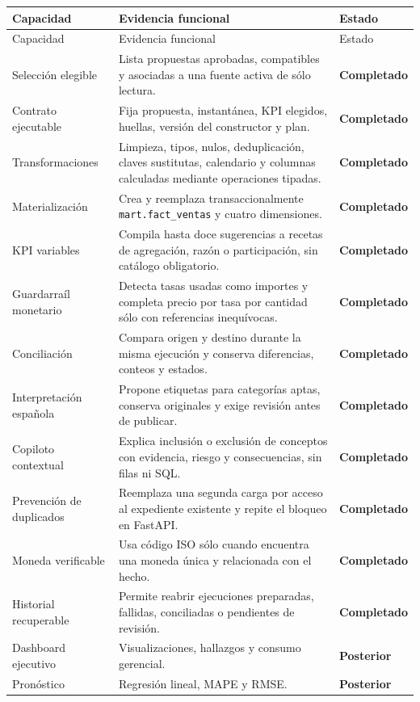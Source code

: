 \documentclass[11pt,letterpaper]{article}
\newcommand{\file}[1]{\texttt{#1}}
\newcommand{\ok}{\textcolor{success}{\textbf{Completado}}}
\newcommand{\pending}{\textcolor{warning}{\textbf{Posterior}}}
\begin{document}
\begin{longtable}{@{}p{}p{}p{}@{}}
  \toprule
  Capacidad & Evidencia funcional & Estado \\
  \midrule
  \endfirsthead
  \toprule
  Capacidad & Evidencia funcional & Estado \\
  \midrule
  \endhead
  Selección elegible & Lista propuestas aprobadas, compatibles y asociadas a una fuente activa de sólo lectura. & \ok \\
  Contrato ejecutable & Fija propuesta, instantánea, KPI elegidos, huellas, versión del constructor y plan. & \ok \\
  Transformaciones & Limpieza, tipos, nulos, deduplicación, claves sustitutas, calendario y columnas calculadas mediante operaciones tipadas. & \ok \\
  Materialización & Crea y reemplaza transaccionalmente \file{mart.fact\_ventas} y cuatro dimensiones. & \ok \\
  KPI variables & Compila hasta doce sugerencias a recetas de agregación, razón o participación, sin catálogo obligatorio. & \ok \\
  Guardarraíl monetario & Detecta tasas usadas como importes y completa precio por tasa por cantidad sólo con referencias inequívocas. & \ok \\
  Conciliación & Compara origen y destino durante la misma ejecución y conserva diferencias, conteos y estados. & \ok \\
  Interpretación española & Propone etiquetas para categorías aptas, conserva originales y exige revisión antes de publicar. & \ok \\
  Copiloto contextual & Explica inclusión o exclusión de conceptos con evidencia, riesgo y consecuencias, sin filas ni SQL. & \ok \\
  Prevención de duplicados & Reemplaza una segunda carga por acceso al expediente existente y repite el bloqueo en FastAPI. & \ok \\
  Moneda verificable & Usa código ISO sólo cuando encuentra una moneda única y relacionada con el hecho. & \ok \\
  Historial recuperable & Permite reabrir ejecuciones preparadas, fallidas, conciliadas o pendientes de revisión. & \ok \\
  Dashboard ejecutivo & Visualizaciones, hallazgos y consumo gerencial. & \pending \\
  Pronóstico & Regresión lineal, MAPE y RMSE. & \pending \\
  \bottomrule
\end{longtable}
\end{document}
